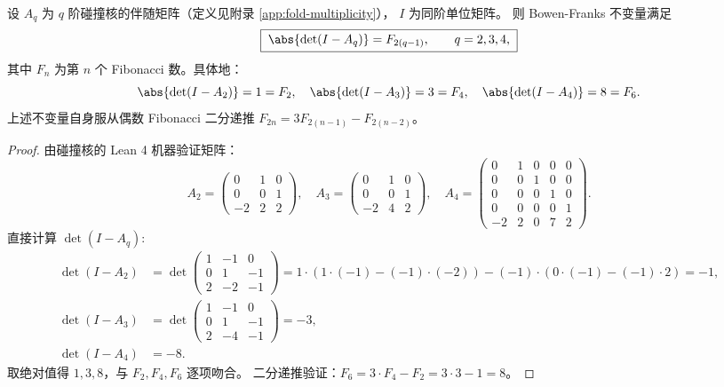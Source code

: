 \begin{theorem}\label{thm:killo-fold-collision-bowen-franks-fibonacci-bisection}
设 \(A_q\) 为 \(q\) 阶碰撞核的伴随矩阵（定义见附录 \ref{app:fold-multiplicity}），
\(I\) 为同阶单位矩阵。
则 Bowen-Franks 不变量满足
\[
\boxed{\;
\abs{\det(I-A_q)}=F_{2(q-1)},\qquad q=2,3,4,
\;}
\]
其中 \(F_n\) 为第 \(n\) 个 Fibonacci 数。具体地：
\[
\abs{\det(I-A_2)}=1=F_2,\quad
\abs{\det(I-A_3)}=3=F_4,\quad
\abs{\det(I-A_4)}=8=F_6.
\]
上述不变量自身服从偶数 Fibonacci 二分递推
\(
F_{2n}=3F_{2(n-1)}-F_{2(n-2)}
\)。
\end{theorem}

\begin{proof}
由碰撞核的 Lean 4 机器验证矩阵：
\[
A_2=\begin{pmatrix}0&1&0\\0&0&1\\-2&2&2\end{pmatrix},\quad
A_3=\begin{pmatrix}0&1&0\\0&0&1\\-2&4&2\end{pmatrix},\quad
A_4=\begin{pmatrix}0&1&0&0&0\\0&0&1&0&0\\0&0&0&1&0\\0&0&0&0&1\\-2&2&0&7&2\end{pmatrix}.
\]
直接计算 \(\det(I-A_q)\):
\begin{align*}
\det(I-A_2)&=\det\begin{pmatrix}1&-1&0\\0&1&-1\\2&-2&-1\end{pmatrix}
=1\cdot(1\cdot(-1)-(-1)\cdot(-2))-(-1)\cdot(0\cdot(-1)-(-1)\cdot 2)=-1,\\
\det(I-A_3)&=\det\begin{pmatrix}1&-1&0\\0&1&-1\\2&-4&-1\end{pmatrix}=-3,\\
\det(I-A_4)&=-8.
\end{align*}
取绝对值得 \(1,3,8\)，与 \(F_2,F_4,F_6\) 逐项吻合。
二分递推验证：\(F_6=3\cdot F_4-F_2=3\cdot 3-1=8\)。
\end{proof}

